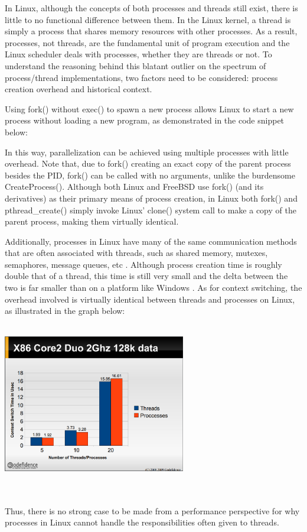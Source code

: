 \documentclass[onecolumn, draftclsnofoot,10pt, compsoc]{IEEEtran}
\begin{document}
In Linux, although the concepts of both processes and threads still exist, there is little to no functional difference between them. In the Linux kernel, a thread is simply a process that shares memory resources with other processes. As a result, processes, not threads, are the fundamental unit of program execution and the Linux scheduler deals with processes, whether they are threads or not. To understand the reasoning behind this blatant outlier on the spectrum of process/thread implementations, two factors need to be considered: process creation overhead and historical context. 

Using fork() without exec() to spawn a new process allows Linux to start a new process without loading a new program, as demonstrated in the code snippet below:


In this way, parallelization can be achieved using multiple processes with little overhead. Note that, due to fork() creating an exact copy of the parent process besides the PID, fork() can be called with no arguments, unlike the burdensome CreateProcess(). Although both Linux and FreeBSD use fork() (and its derivatives) as their primary means of process creation, in Linux both fork() and pthread\_create() simply invoke Linux' clone() system call to make a copy of the parent process, making them virtually identical.

Additionally, processes in Linux have many of the same communication methods that are often associated with threads, such as shared memory, mutexes, semaphores, message queues, etc \cite{LinuxSlides}. Although process creation time is roughly double that of a thread, this time is still very small and the delta between the two is far smaller than on a platform like Windows \cite{LinuxSlides}. As for context switching, the overhead involved is virtually identical between threads and processes on Linux, as illustrated in the graph below:\\ \\
\begin{minipage}{\linewidth}
\begin{center}
\includegraphics[width=0.6\textwidth]{context_switch_overhead.eps}
\end{center}
\end{minipage}
\\ \\Thus, there is no strong case to be made from a performance perspective for why processes in Linux cannot handle the responsibilities often given to threads.
\end{document}
